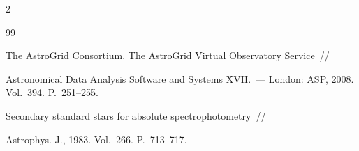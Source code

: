 \begin{multicols}{2}
{{\begin{thebibliography}{99}


The AstroGrid Consortium. The AstroGrid Virtual Observatory Service~// 

Astronomical Data Analysis Software and Systems XVII.~--- London: ASP, 2008. Vol.~394. P.~251--255.



\label{end\stat}




 Secondary standard stars for absolute spectrophotometry~// 

Astrophys. J., 1983. Vol.~266. P.~713--717.

\end{thebibliography}

}

}





\end{multicols}

